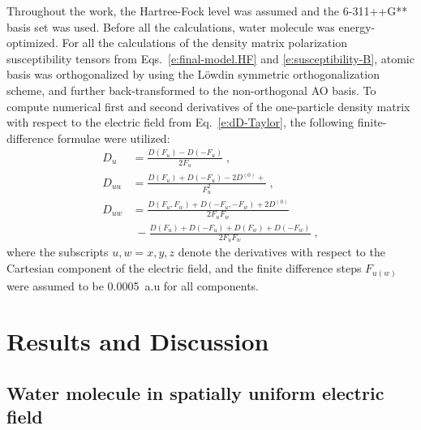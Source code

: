 \documentclass[aip,amsmath,amssymb,reprint,floatfix]{revtex4-1}
\begin{document}
%
Throughout the work, the Hartree\hyp{}Fock level\cite{Roothaan.RevModPhys.1951} was assumed 
and the 6-311++G** basis set\cite{Krishnan.Binkley.Seeger.Pople.JCP.1980}
was used. Before all the calculations, water molecule was energy\hyp{}optimized.
For all the calculations of the density matrix polarization susceptibility tensors
from Eqs.~\eqref{e:final-model.HF} and \eqref{e:susceptibility-B}, 
atomic basis was orthogonalized by using the L{\"o}wdin symmetric orthogonalization scheme,\cite{Mayer.IJQC.2002}
and further back\hyp{}transformed to the non\hyp{}orthogonal AO basis.
To compute numerical first and second derivatives of the one\hyp{}particle density matrix
with respect to the electric field from Eq.~\eqref{e:dD-Taylor}, 
the following finite\hyp{}difference formulae were utilized:
%
\begin{subequations}\label{e:ff}
  \begin{align}
    D_u    &= \frac{D(F_u) - D(-F_u)}{2F_u} \;,\\
    D_{uu} &= \frac{D(F_u) + D(-F_u) - 2D^{(0)}+}{F_u^2} \;,\\
    D_{uw} &= \frac{D(F_u,F_w) + D(-F_u,-F_w) + 2D^{(0)}}{2F_uF_w} \nonumber \\ 
           & \; -\frac{D(F_u) + D(-F_u) + D(F_w) + D(-F_w)}{2F_uF_w} \;,
  \end{align}
\end{subequations}
%
where 
the subscripts $u,w=x,y,z$ denote the derivatives with respect 
to the Cartesian component of the electric field, and the finite difference
steps $F_{u(w)}$ were assumed to be 0.0005~a.u for all components. 

\section{\label{s:4}Results and Discussion}

\subsection{\label{ss:41}Water molecule in spatially uniform electric field}
\end{document}
